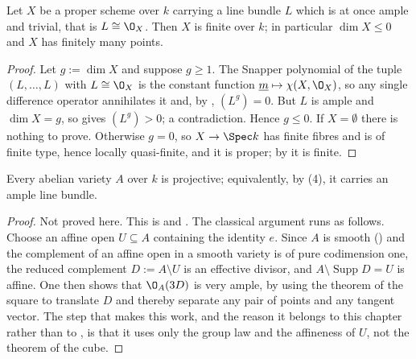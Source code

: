 \begin{corollary}
\label{cor:deg-ample-trivial-finite}
Let $X$ be a proper scheme over $k$ carrying a line bundle $L$ which is at once
ample and trivial, that is $L\cong\O_X$.  Then $X$ is finite over $k$; in
particular $\dim X\leq0$ and $X$ has finitely many points.
\end{corollary}
\begin{proof}
Let $g:=\dim X$ and suppose $g\geq1$.  The Snapper polynomial of the tuple
$(L,\dots,L)$ with $L\cong\O_X$ is the constant function
$\underline m\mapsto\chi(X,\O_X)$, so any single difference operator
annihilates it and, by ,
$(L^g)=0$.  But $L$ is ample and $\dim X=g$, so
 gives $(L^g)>0$; a contradiction.  Hence
$g\leq0$.  If $X=\emptyset$ there is nothing to prove.  Otherwise $g=0$, so
$X\to\Spec k$ has finite fibres and is of finite type, hence locally
quasi-finite, and it is proper; by
 it is finite.
\end{proof}

\begin{proposition}
\label{prop:deg-abelian-projective}
Every abelian variety $A$ over $k$ is projective; equivalently, by
(4), it carries an ample line bundle.
\end{proposition}
\begin{proof}
Not proved here.  This is \cite[\S6]{MumfordAbelianVarieties} and
\cite[I, \S7]{MilneAbelianVarieties}.  The classical argument runs as follows.
Choose an affine open $U\subseteq A$ containing the identity $e$.  Since $A$ is
smooth () and the complement of an affine open in a smooth
variety is of pure codimension one, the reduced complement $D:=A\setminus U$ is
an effective divisor, and $A\setminus\operatorname{Supp}D=U$ is affine.  One
then shows that $\O_A(3D)$ is very ample, by using the theorem of the square to
translate $D$ and thereby separate any pair of points and any tangent vector.
The step that makes this work, and the reason it belongs to this chapter rather
than to , is that it uses only the group law and the affineness
of $U$, not the theorem of the cube.
\end{proof}

